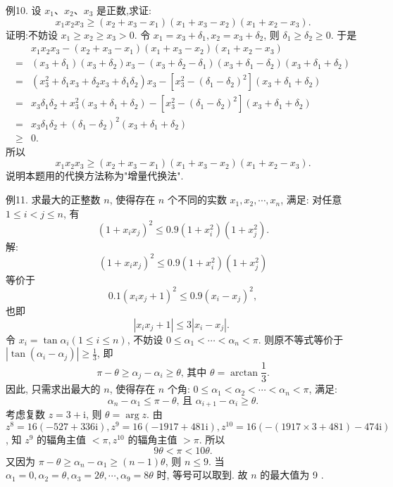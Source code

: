 例10. 设 $x_1 、 x_2 、 x_3$ 是正数,求证:
$$
x_1 x_2 x_3 \geqslant\left(x_2+x_3-x_1\right)\left(x_1+x_3-x_2\right)\left(x_1+x_2-x_3\right) .
$$
证明:不妨设 $x_1 \geqslant x_2 \geqslant x_3>0$.
令 $x_1=x_3+\delta_1, x_2=x_3+\delta_2$, 则 $\delta_1 \geqslant \delta_2 \geqslant 0$. 于是
$$
\begin{aligned}
& x_1 x_2 x_3-\left(x_2+x_3-x_1\right)\left(x_1+x_3-x_2\right)\left(x_1+x_2-x_3\right) \\
= & \left(x_3+\delta_1\right)\left(x_3+\delta_2\right) x_3-\left(x_3+\delta_2-\delta_1\right)\left(x_3+\delta_1-\delta_2\right)\left(x_3+\delta_1+\delta_2\right) \\
= & \left(x_3^2+\delta_1 x_3+\delta_2 x_3+\delta_1 \delta_2\right) x_3-\left[x_3^2-\left(\delta_1-\delta_2\right)^2\right]\left(x_3+\delta_1+\delta_2\right) \\
= & x_3 \delta_1 \delta_2+x_3^2\left(x_3+\delta_1+\delta_2\right)-\left[x_3^2-\left(\delta_1-\delta_2\right)^2\right]\left(x_3+\delta_1+\delta_2\right) \\
= & x_3 \delta_1 \delta_2+\left(\delta_1-\delta_2\right)^2\left(x_3+\delta_1+\delta_2\right) \\
\geqslant & 0 .
\end{aligned}
$$
所以
$$
x_1 x_2 x_3 \geqslant\left(x_2+x_3-x_1\right)\left(x_1+x_3-x_2\right)\left(x_1+x_2-x_3\right) .
$$
说明本题用的代换方法称为"增量代换法".



例11. 求最大的正整数 $n$, 使得存在 $n$ 个不同的实数 $x_1, x_2, \cdots, x_n$, 满足: 对任意 $1 \leqslant i<j \leqslant n$, 有
$$
\left(1+x_i x_j\right)^2 \leqslant 0.9\left(1+x_i^2\right)\left(1+x_j^2\right) .
$$
解:$$
\left(1+x_i x_j\right)^2 \leqslant 0.9\left(1+x_i^2\right)\left(1+x_j^2\right)
$$
等价于
$$
0.1\left(x_i x_j+1\right)^2 \leqslant 0.9\left(x_i-x_j\right)^2,
$$
也即
$$
\left|x_i x_j+1\right| \leqslant 3\left|x_i-x_j\right| \text {. }
$$
令 $x_i=\tan \alpha_i(1 \leqslant i \leqslant n)$, 不妨设 $0 \leqslant \alpha_1<\cdots<\alpha_n<\pi$.
则原不等式等价于 $\left|\tan \left(\alpha_i-\alpha_j\right)\right| \geqslant \frac{1}{3}$, 即
$$
\pi-\theta \geqslant \alpha_j-\alpha_i \geqslant \theta \text {, 其中 } \theta=\arctan \frac{1}{3} .
$$
因此, 只需求出最大的 $n$, 使得存在 $n$ 个角: $0 \leqslant \alpha_1<\alpha_2<\cdots<\alpha_n<\pi$, 满足:
$$
\alpha_n-\alpha_1 \leqslant \pi-\theta \text {, 且 } \alpha_{i+1}-\alpha_i \geqslant \theta .
$$
考虑复数 $z=3+\mathrm{i}$, 则 $\theta=\arg z$.
由 $z^8=16(-527+336 \mathrm{i}), z^9=16(-1917+481 \mathrm{i}), z^{10}=16(-(1917 \times 3+481)-474 \mathrm{i})$, 知 $z^9$ 的辐角主值 $<\pi, z^{10}$ 的辐角主值 $>\pi$. 所以
$$
9 \theta<\pi<10 \theta .
$$
又因为 $\pi-\theta \geqslant \alpha_n-\alpha_1 \geqslant(n-1) \theta$, 则 $n \leqslant 9$.
当 $\alpha_1=0, \alpha_2=\theta, \alpha_3=2 \theta, \cdots, \alpha_9=8 \theta$ 时, 等号可以取到.
故 $n$ 的最大值为 9 .



